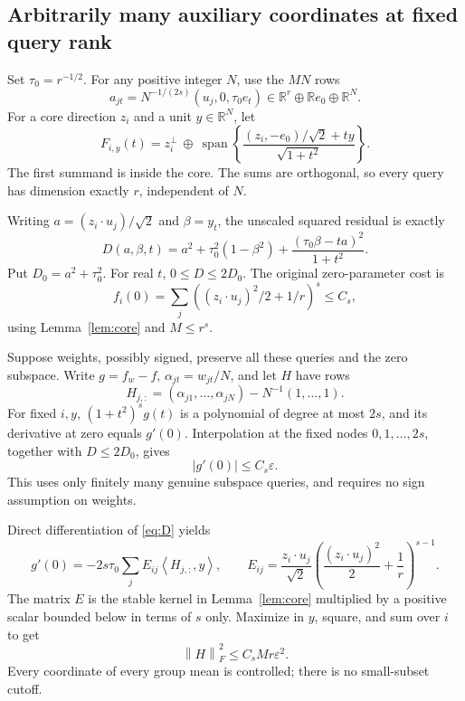 \documentclass[11pt]{article}
\theoremstyle{remark}\newtheorem{remark}[theorem]{Remark}
\newcommand{\R}{\mathbb R}\newcommand{\E}{\mathbb E}\newcommand{\Prob}{\mathbb P}
\newcommand{\eps}{\varepsilon}\newcommand{\Sym}{\operatorname{Sym}}
\newcommand{\norm}[1]{\left\|#1\right\|}\newcommand{\ip}[2]{\left\langle #1,#2\right\rangle}
\begin{document}
\subsection{Arbitrarily many auxiliary coordinates at fixed query rank}
Set $\tau_0=r^{-1/2}$. For any positive integer $N$, use the $MN$ rows
\begin{equation}\label{eq:lower-input}
 a_{jt}=N^{-1/(2s)}(u_j,0,\tau_0e_t)\in\R^r\oplus\R e_0\oplus\R^N.
\end{equation}
For a core direction $z_i$ and a unit $y\in\R^N$, let
\begin{equation}\label{eq:lower-query}
 F_{i,y}(t)=z_i^\perp\ \oplus\
 \operatorname{span}\left\{\frac{(z_i,-e_0)/\sqrt2+t y}{\sqrt{1+t^2}}\right\}.
\end{equation}
The first summand is inside the core. The sums are orthogonal, so every query has dimension exactly $r$, independent of $N$.

Writing $a=(z_i\cdot u_j)/\sqrt2$ and $\beta=y_t$, the unscaled squared residual is exactly
\begin{equation}\label{eq:D}
 D(a,\beta,t)=a^2+\tau_0^2(1-\beta^2)+\frac{(\tau_0\beta-ta)^2}{1+t^2}.
\end{equation}
Put $D_0=a^2+\tau_0^2$. For real $t$, $0\le D\le2D_0$. The original zero-parameter cost is
\[
 f_i(0)=\sum_j\left((z_i\cdot u_j)^2/2+1/r\right)^s\le C_s,
\]
using Lemma~\ref{lem:core} and $M\le r^s$.

Suppose weights, possibly signed, preserve all these queries and the zero subspace. Write $g=f_w-f$, $\alpha_{jt}=w_{jt}/N$, and let $H$ have rows
\[
 H_{j,:}=(\alpha_{j1},\ldots,\alpha_{jN})-N^{-1}(1,\ldots,1).
\]
For fixed $i,y$, $(1+t^2)^sg(t)$ is a polynomial of degree at most $2s$, and its derivative at zero equals $g'(0)$. Interpolation at the fixed nodes $0,1,\ldots,2s$, together with $D\le2D_0$, gives
\begin{equation}\label{eq:derivative}
 |g'(0)|\le C_s\eps.
\end{equation}
This uses only finitely many genuine subspace queries, and requires no sign assumption on weights.

Direct differentiation of \eqref{eq:D} yields
\[
 g'(0)=-2s\tau_0\sum_j E_{ij}\ip{H_{j,:}}{y},\qquad
 E_{ij}=\frac{z_i\cdot u_j}{\sqrt2}\left(\frac{(z_i\cdot u_j)^2}{2}+\frac1r\right)^{s-1}.
\]
The matrix $E$ is the stable kernel in Lemma~\ref{lem:core} multiplied by a positive scalar bounded below in terms of $s$ only. Maximize in $y$, square, and sum over $i$ to get
\begin{equation}\label{eq:Hlower}
 \norm H_F^2\le C_sMr\eps^2.
\end{equation}
Every coordinate of every group mean is controlled; there is no small-subset cutoff.
\end{document}
